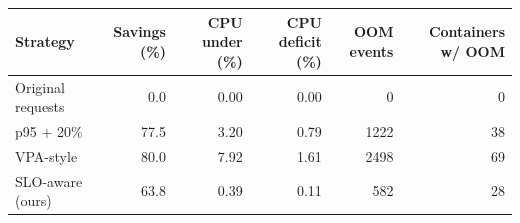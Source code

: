 \begin{tabular}{lrrrrr}\toprule
Strategy & Savings (\%) & CPU under (\%) & CPU deficit (\%) & OOM events & Containers w/ OOM \\\midrule
Original requests & 0.0 & 0.00 & 0.00 & 0 & 0 \\
p95 + 20\% & 77.5 & 3.20 & 0.79 & 1222 & 38 \\
VPA-style & 80.0 & 7.92 & 1.61 & 2498 & 69 \\
SLO-aware (ours) & 63.8 & 0.39 & 0.11 & 582 & 28 \\
\bottomrule\end{tabular}
